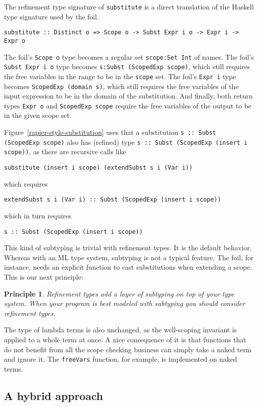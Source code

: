 \documentclass[sigconf, review]{acmart}
\newcommand{\tc}[1]{{\small\texttt{#1}}}
\newtheorem{principle}{Principle}
\begin{document}
The refinement type signature of \tc{substitute} is a direct translation of the
Haskell type signature used by the foil.
\begin{verbatim}
substitute :: Distinct o => Scope o -> Subst Expr i o -> Expr i -> Expr o
\end{verbatim}
The foil's \tc{Scope o} type becomes a
regular set \tc{scope:Set Int} of names. The foil's \tc{Subst Expr i o} type
becomes \tc{s:Subst (ScopedExp scope)}, which still requires the free variables
in the range to be in the \tc{scope} set. The foil's \tc{Expr i} type becomes
\tc{ScopedExp (domain s)}, which still requires the free variables of the input
expression to be in the domain of the substitution. And finally, both return types
\tc{Expr o} and \tc{ScopedExp scope} require the free variables of the output to
be in the given scope set.

Figure~\ref{rapier-style-substitution} uses that a substitution
\tc{s :: Subst (ScopedExp scope)}
also has (refined) type
\tc{s :: Subst (ScopedExp (insert i scope))},
as there are recursive calls like
\begin{verbatim}
substitute (insert i scope) (extendSubst s i (Var i))
\end{verbatim}
which requires
\begin{verbatim}
extendSubst s i (Var i) :: Subst (ScopedExp (insert i scope))
\end{verbatim}
which in turn requires
\begin{verbatim}
s :: Subst (ScopedExp (insert i scope))
\end{verbatim}
This kind of subtyping is trivial with refinement types. It is the default
behavior. Whereas with an ML type system, subtyping is not a typical feature. The
foil, for instance, needs an explicit function to cast substitutions when
extending a scope. This is our next principle:
\begin{principle}
  Refinement types add a layer of subtyping on top of your type system. When
  your program is best modeled with subtyping you should consider refinement
  types.
\end{principle}

The type of lambda terms is also unchanged, as the well-scoping invariant is
applied to a whole term at once. A nice consequence of it is that functions
that do not benefit from all the scope checking business can simply take a naked
term and ignore it. The \tc{freeVars} function, for example, is implemented on
naked terms.

\subsection{A hybrid approach}
\label{ensuring-the-scope-set-is-checked}
\end{document}
